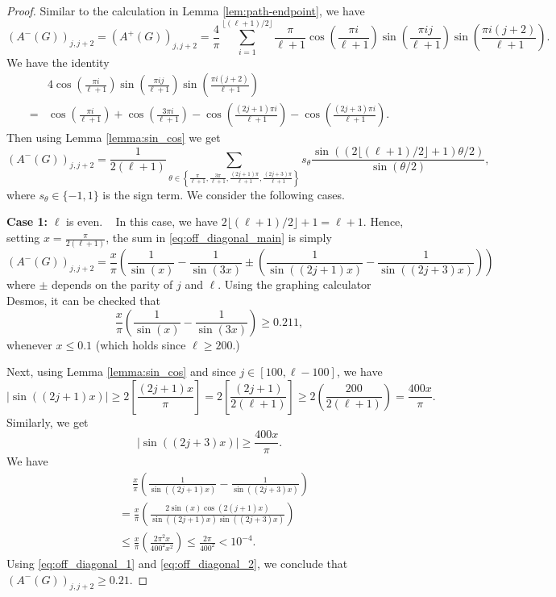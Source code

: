 \documentclass[10pt,a4paper]{amsart}
\begin{document}
\begin{proof}
Similar to the calculation in Lemma \ref{lem:path-endpoint}, we have
    \[(A^-(G))_{j, j + 2} = (A^+(G))_{j, j + 2} = \frac{4}{\pi} \sum_{i = 1}^{\lfloor (\ell + 1) / 2 \rfloor} \frac{\pi}{\ell + 1} \cos \left(\frac{\pi i }{\ell + 1}\right) \sin \left(\frac{\pi i j}{\ell + 1}\right) \sin \left(\frac{\pi i (j + 2)}{\ell + 1}\right).\]
We have the identity
    \begin{align*}
    &4\cos \left(\frac{\pi i }{\ell + 1}\right) \sin \left(\frac{\pi i j}{\ell + 1}\right) \sin \left(\frac{\pi i (j + 2)}{\ell + 1}\right) \\
    =&  \cos\left(\frac{\pi i }{\ell + 1}\right) + \cos\left(\frac{3\pi i }{\ell + 1}\right) - \cos\left(\frac{(2j + 1)\pi i }{\ell + 1}\right) - \cos\left(\frac{(2j + 3)\pi i }{\ell + 1}\right).    
    \end{align*}
Then using Lemma \ref{lemma:sin_cos} we get
\begin{equation}\label{eq:off_diagonal_main}
    (A^-(G))_{j, j + 2} = \frac{1}{2(\ell + 1)}\sum_{\theta \in \left\{\frac{\pi}{\ell + 1}, \frac{3\pi}{\ell + 1}, \frac{(2j + 1)\pi }{\ell + 1}, \frac{(2j + 3)\pi }{\ell + 1}\right\}} s_\theta\frac{\sin((2 \lfloor (\ell + 1) / 2 \rfloor + 1) \theta / 2)}{\sin(\theta / 2)},
\end{equation}
where $s_{\theta} \in \{-1, 1\}$ is the sign term. We consider the following cases.

\textbf{Case 1:} $\ell$ is even. ~ In this case, we have $2 \lfloor (\ell + 1) / 2 \rfloor + 1 = \ell + 1.$ Hence, setting $x = \frac{\pi}{2(\ell + 1)}$, the sum in \eqref{eq:off_diagonal_main} is simply
    $$(A^-(G))_{j, j + 2} = \frac{x}{\pi} \left(\frac{1}{\sin(x)} - \frac{1}{\sin(3x)} \pm \left(\frac{1}{\sin((2j + 1) x)} - \frac{1}{\sin((2j + 3) x)}\right)\right)$$
where $\pm$ depends on the parity of $j$ and $\ell$. Using the graphing calculator Desmos, it can be checked that
   \begin{equation}\label{eq:off_diagonal_1}
       \frac{x}{\pi}\left( \frac{1}{\sin(x)} - \frac{1}{\sin(3x)}\right)\ge 0.211, 
   \end{equation}
whenever $x\le 0.1$ (which holds since $\ell\ge 200$.)

Next, using Lemma \ref{lemma:sin_cos} and since $j\in [100, \ell - 100]$, we have 
\[ |\sin((2j+1)x)| \ge 2\left[ \frac{(2j+1)x}{\pi}\right] = 2\left[ \frac{(2j+1)}{2(\ell +1)}\right]\ge 2\left(\frac{200}{2(\ell +1)}\right) = \frac{400x}{\pi}.\]
Similarly, we get
\[ |\sin((2j+3)x)|\ge \frac{400x}{\pi}.\]
We have 
\begin{align}\label{eq:off_diagonal_2}
     & \  \quad \frac{x}{\pi}\left(\frac{1}{\sin((2j + 1) x)} - \frac{1}{\sin((2j + 3) x)}\right) \nonumber\\
     & = \frac{x}{\pi}\left( \frac{2 \sin(x) \cos(2(j + 1) x)}{\sin((2j + 1) x) \sin((2j + 3) x)}\right)\nonumber\\
     & \le \frac{x}{\pi}\left(\frac{2 \pi^2 x}{400^2 x^2}\right) \le \frac{2\pi}{400^2}< 10^{-4}.
\end{align}
Using \eqref{eq:off_diagonal_1} and \eqref{eq:off_diagonal_2}, we conclude that $(A^-(G))_{j, j + 2} \geq 0.21.$


\end{proof}
\end{document}
